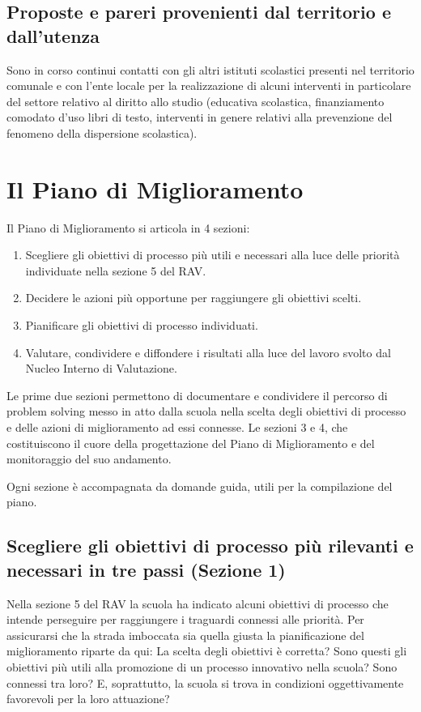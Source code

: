 \documentclass[12pt,a4paper,oneside]{memoir}
\begin{document}
\section{Proposte e pareri provenienti dal territorio e dall'utenza}
Sono in corso continui contatti con gli altri istituti scolastici presenti nel territorio comunale e con l'ente locale per la realizzazione di alcuni interventi in particolare del settore relativo al diritto allo studio (educativa scolastica, finanziamento comodato d'uso libri di testo, interventi in genere relativi alla prevenzione del fenomeno della dispersione scolastica).


\chapter{Il Piano di Miglioramento}
Il Piano di Miglioramento si articola in 4 sezioni:
\begin{enumerate}
\item Scegliere gli obiettivi di processo più utili e necessari alla luce delle priorità individuate nella sezione 5 del RAV.
\item Decidere le azioni più opportune per raggiungere gli obiettivi scelti.
\item Pianificare gli obiettivi di processo individuati.
\item Valutare, condividere e diffondere i risultati alla luce del lavoro svolto dal Nucleo Interno di Valutazione.
\end{enumerate}
Le prime due sezioni permettono di documentare e condividere il percorso di problem solving messo in atto dalla scuola nella scelta degli obiettivi di processo e delle azioni di miglioramento ad essi connesse. Le sezioni 3 e 4, che costituiscono il cuore della progettazione del Piano di Miglioramento e del monitoraggio del suo andamento.

Ogni sezione è accompagnata da domande guida, utili per la compilazione del piano.


\section[Sezione 1. Scegliere gli obiettivi di processo]{Scegliere gli obiettivi di processo più rilevanti e necessari in tre passi (Sezione 1)}

Nella sezione 5 del RAV la scuola ha indicato alcuni obiettivi di processo che intende perseguire per raggiungere i traguardi connessi alle priorità. Per assicurarsi che la strada imboccata sia quella giusta la pianificazione del miglioramento riparte da qui: La scelta degli obiettivi è corretta? Sono questi gli obiettivi più utili alla promozione di un processo innovativo nella scuola? Sono connessi tra loro? E, soprattutto, la scuola si trova in condizioni oggettivamente favorevoli per la loro attuazione?
\end{document}
